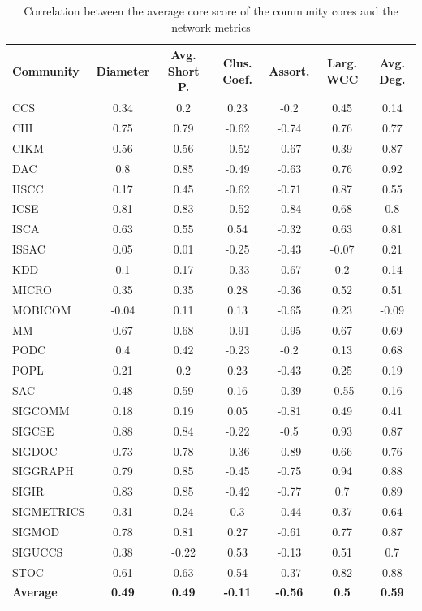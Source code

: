 \begin{table}[!htbp]
\centering
\caption{Correlation between the average core score of the community cores and the network metrics}
\label{tab:correlation_metrics}
{\small
\begin{tabular}{|l|c|c|c|c|c|c|} \hline
\bf Community & \bf Diameter & \bf Avg. Short P. & \bf Clus. Coef. & \bf Assort. & \bf Larg. WCC & \bf Avg. Deg. \\ \hline
CCS & 0.34 & 0.2 & 0.23 & -0.2 & 0.45 & 0.14 \\ \hline
CHI & 0.75 & 0.79 & -0.62 & -0.74 & 0.76 & 0.77 \\ \hline
CIKM & 0.56 & 0.56 & -0.52 & -0.67 & 0.39 & 0.87 \\ \hline
DAC & 0.8 & 0.85 & -0.49 & -0.63 & 0.76 & 0.92 \\ \hline
HSCC & 0.17 & 0.45 & -0.62 & -0.71 & 0.87 & 0.55 \\ \hline
ICSE & 0.81 & 0.83 & -0.52 & -0.84 & 0.68 & 0.8 \\ \hline
ISCA & 0.63 & 0.55 & 0.54 & -0.32 & 0.63 & 0.81  \\ \hline
ISSAC & 0.05 & 0.01 & -0.25 & -0.43 & -0.07 & 0.21 \\ \hline
KDD & 0.1 & 0.17 & -0.33 & -0.67 & 0.2 & 0.14\\ \hline
MICRO & 0.35 & 0.35 & 0.28 & -0.36 & 0.52 & 0.51 \\ \hline
MOBICOM & -0.04 & 0.11 & 0.13 & -0.65 & 0.23 & -0.09 \\ \hline
MM & 0.67 & 0.68 & -0.91 & -0.95 & 0.67 & 0.69 \\ \hline
PODC & 0.4 & 0.42 & -0.23 & -0.2 & 0.13 & 0.68 \\ \hline
POPL & 0.21 & 0.2 & 0.23 & -0.43 & 0.25 & 0.19 \\ \hline
SAC & 0.48 & 0.59 & 0.16 & -0.39 & -0.55 & 0.16 \\ \hline
SIGCOMM & 0.18 & 0.19 & 0.05 & -0.81 & 0.49 & 0.41\\ \hline
SIGCSE & 0.88 & 0.84 & -0.22 & -0.5 & 0.93 & 0.87 \\ \hline
SIGDOC & 0.73 & 0.78 & -0.36 & -0.89 & 0.66 & 0.76 \\ \hline
SIGGRAPH & 0.79 & 0.85 & -0.45 & -0.75 & 0.94 & 0.88 \\ \hline
SIGIR & 0.83 & 0.85 & -0.42 & -0.77 & 0.7 & 0.89 \\ \hline
SIGMETRICS & 0.31 & 0.24 & 0.3 & -0.44 & 0.37 & 0.64 \\ \hline
SIGMOD & 0.78 & 0.81 & 0.27 & -0.61 & 0.77 & 0.87 \\ \hline
SIGUCCS & 0.38 & -0.22 & 0.53 & -0.13 & 0.51 & 0.7 \\ \hline
STOC & 0.61 & 0.63 & 0.54 & -0.37 & 0.82 & 0.88\\ \hline \hline
{\bf Average} & {\bf 0.49} & {\bf 0.49} & {\bf -0.11} & {\bf -0.56} & {\bf 0.5} & {\bf 0.59} \\ \hline
\end{tabular}
}
\end{table}


